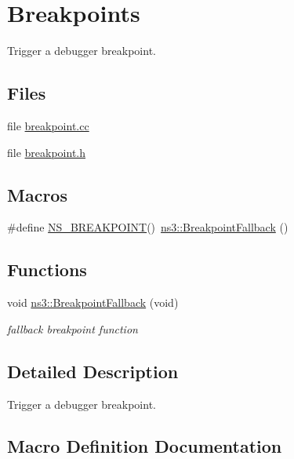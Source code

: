 \hypertarget{group__breakpoint}{}\section{Breakpoints}
\label{group__breakpoint}


Trigger a debugger breakpoint.  


\subsection*{Files}
\begin{DoxyCompactItemize}
\item 
file \hyperlink{breakpoint_8cc}{breakpoint.\+cc}
\item 
file \hyperlink{breakpoint_8h}{breakpoint.\+h}
\end{DoxyCompactItemize}
\subsection*{Macros}
\begin{DoxyCompactItemize}
\item 
\#define \hyperlink{group__breakpoint_ga34cfff9b3943fcc753f954a395f5d7f1}{N\+S\+\_\+\+B\+R\+E\+A\+K\+P\+O\+I\+NT}()~\hyperlink{group__breakpoint_ga1b2bb5af45b0dd545f6101aafdde0936}{ns3\+::\+Breakpoint\+Fallback} ()
\end{DoxyCompactItemize}
\subsection*{Functions}
\begin{DoxyCompactItemize}
\item 
void \hyperlink{group__breakpoint_ga1b2bb5af45b0dd545f6101aafdde0936}{ns3\+::\+Breakpoint\+Fallback} (void)
\begin{DoxyCompactList}\small\item\em fallback breakpoint function \end{DoxyCompactList}\end{DoxyCompactItemize}


\subsection{Detailed Description}
Trigger a debugger breakpoint. 



\subsection{Macro Definition Documentation}
